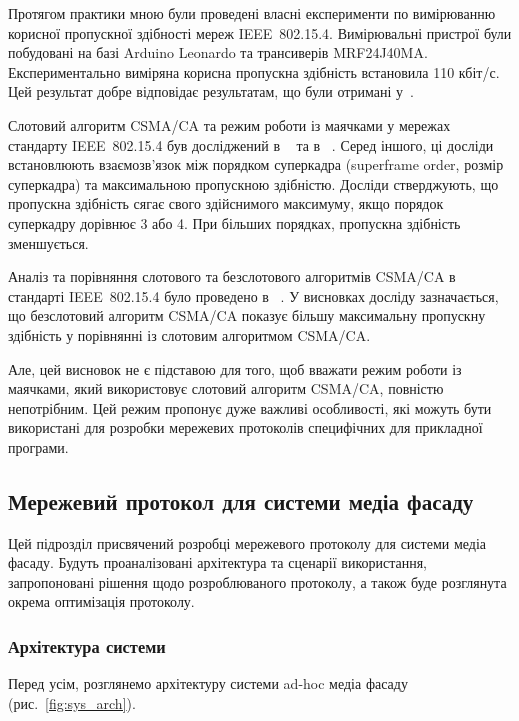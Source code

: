 \documentclass[a4paper,ukrainian,utf8,nocolumnsxix,floatsection]{eskdtext}
\renewcommand\paragraph{\subsubsection}
\newcommand{\figref}[1]{рис.~\ref{#1}}
\newcommand{\iee}[0]{IEEE~802.15.4\xspace}
\newcommand{\csma}[0]{CSMA/CA\xspace}
\begin{document}
Протягом практики мною були проведені власні експерименти по вимірюванню корисної пропускної здібності мереж \iee. Вимірювальні пристрої були побудовані на базі Arduino Leonardo та трансиверів MRF24J40MA. Експериментально виміряна корисна пропускна здібність встановила 110 кбіт/с. Цей результат добре відповідає результатам, що були отримані у~\cite{thoroughput:analysis:unslotted:ieee}.

Слотовий алгоритм \csma та режим роботи із маячками у мережах стандарту \iee був досліджений в ~\cite{simulation:study:slotted:ieee} та в ~\cite{gts:allocation:analysis}. Серед іншого, ці досліди встановлюють взаємозв'язок між порядком суперкадра (superframe order, розмір суперкадра) та максимальною пропускною здібністю. Досліди стверджують, що пропускна здібність сягає свого здійснимого максимуму, якщо порядок суперкадру дорівнює 3 або 4. При більших порядках, пропускна здібність зменшується.

Аналіз та порівняння слотового та безслотового алгоритмів \csma в стандарті \iee було проведено в ~\cite{analysis:slotted:unslotted}. У висновках досліду зазначається, що безслотовий алгоритм \csma  показує більшу максимальну пропускну здібність у порівнянні із слотовим алгоритмом \csma.

Але, цей висновок не є підставою для того, щоб вважати режим роботи із маячками, який використовує слотовий алгоритм \csma, повністю непотрібним. Цей режим пропонує дуже важливі особливості, які можуть бути використані для розробки мережевих протоколів специфічних для прикладної програми.

\subsection{Мережевий протокол для системи медіа фасаду}
\label{sub:network:protocol:amf}


Цей підрозділ присвячений розробці мережевого протоколу для системи медіа фасаду. Будуть проаналізовані архітектура та сценарії використання, запропоновані рішення щодо розроблюваного протоколу, а також буде розглянута окрема оптимізація протоколу.

\paragraph{Архітектура системи}
\label{par:system:arch}

Перед усім, розглянемо архітектуру системи ad-hoc медіа фасаду (\figref{fig:sys_arch}). 
\end{document}
